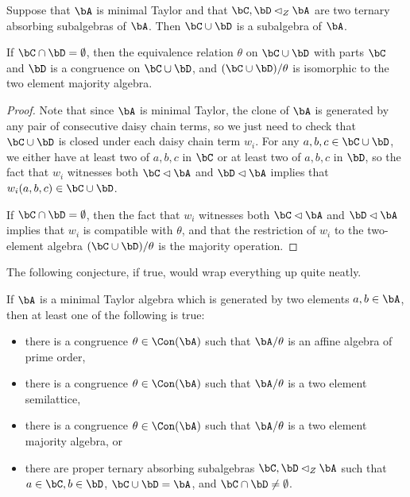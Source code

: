 \begin{cor}\label{cor-minimal-central-majority} Suppose that $\bA$ is minimal Taylor and that $\bC, \bD \lhd_Z \bA$ are two ternary absorbing subalgebras of $\bA$. Then $\bC \cup \bD$ is a subalgebra of $\bA$.

If $\bC \cap \bD = \emptyset$, then the equivalence relation $\theta$ on $\bC \cup \bD$ with parts $\bC$ and $\bD$ is a congruence on $\bC \cup \bD$, and $(\bC \cup \bD)/\theta$ is isomorphic to the two element majority algebra.
\end{cor}
\begin{proof} Note that since $\bA$ is minimal Taylor, the clone of $\bA$ is generated by any pair of consecutive daisy chain terms, so we just need to check that $\bC \cup \bD$ is closed under each daisy chain term $w_i$. For any $a,b,c \in \bC\cup \bD$, we either have at least two of $a,b,c$ in $\bC$ or at least two of $a,b,c$ in $\bD$, so the fact that $w_i$ witnesses both $\bC \lhd \bA$ and $\bD \lhd \bA$ implies that $w_i(a,b,c) \in \bC \cup \bD$.

If $\bC \cap \bD = \emptyset$, then the fact that $w_i$ witnesses both $\bC \lhd \bA$ and $\bD \lhd \bA$ implies that $w_i$ is compatible with $\theta$, and that the restriction of $w_i$ to the two-element algebra $(\bC \cup \bD)/\theta$ is the majority operation.
\end{proof}

The following conjecture, if true, would wrap everything up quite neatly.

\begin{conj} If $\bA$ is a minimal Taylor algebra which is generated by two elements $a,b \in \bA$, then at least one of the following is true:
\begin{itemize}
\item there is a congruence $\theta \in \Con(\bA)$ such that $\bA/\theta$ is an affine algebra of prime order,
\item there is a congruence $\theta \in \Con(\bA)$ such that $\bA/\theta$ is a two element semilattice,
\item there is a congruence $\theta \in \Con(\bA)$ such that $\bA/\theta$ is a two element majority algebra, or
\item there are proper ternary absorbing subalgebras $\bC, \bD \lhd_Z \bA$ such that $a \in \bC, b\in \bD$, $\bC \cup \bD = \bA$, and $\bC \cap \bD \ne \emptyset$.
\end{itemize}
\end{conj}

